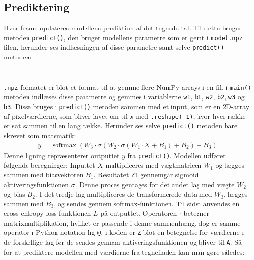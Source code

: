 \documentclass{article}
\begin{document}
\subsection{Prediktering}
Hver frame opdateres modellens prediktion af det tegnede tal. Til dette bruges metoden \texttt{predict()}, den bruger modellens parametre som er gemt i \texttt{model.npz} filen, herunder ses indlæsningen af disse parametre samt selve \texttt{predict()} metoden:
\inputminted[firstline=100, lastline=110]{python}{run.py}\noindent
\inputminted[firstline=89, lastline=97]{python}{run.py}\noindent
\texttt{.npz} formatet er blot et format til at gemme flere NumPy arrays i en fil. i \texttt{main()} metoden indlæses disse parametre og gemmes i variablerne \texttt{w1}, \texttt{b1}, \texttt{w2}, \texttt{b2}, \texttt{w3} og \texttt{b3}. Disse bruges i \texttt{predict()} metoden sammen med et input, som er en 2D-array af pixelværdierne, som bliver lavet om til \texttt{x} med \texttt{.reshape(-1)}, hvor hver række er sat sammen til en lang række. Herunder ses selve \texttt{predict()} metoden bare skrevet som matematik:
\begin{align}
  y = \operatorname{softmax}\left( W_3 \cdot \sigma\left( W_2 \cdot \sigma\left( W_1 \cdot X + B_1 \right) + B_2 \right) + B_3 \right)
\end{align}
Denne ligning repræsenterer outputtet $y$ fra \texttt{predict()}. Modellen udfører følgende beregninger: Inputtet $X$ multipliceres med vægtmatricen $W_1$ og lægges sammen med biasvektoren $B_1$. Resultatet \texttt{Z1} gennemgår sigmoid aktiveringsfunktionen $\sigma$. Denne proces gentages for det andet lag med vægte $W_2$ og bias $B_2$. I det tredje lag multipliceres de transformerede data med $W_3$, lægges sammen med $B_3$, og sendes gennem softmax-funktionen. Til sidst anvendes en cross-entropy loss funktionen $L$ på outputtet. Operatoren $\cdot$ betegner matrixmultiplikation, hvilket er passende i denne sammenhæng, dog er samme operator i Python-notation lig \texttt{@}. i koden er \texttt{Z} blot en betegnelse for værdierne i de forskellige lag før de sendes gennem aktiveringsfunktionen og bliver til \texttt{A}. Så for at prediktere modellen med værdierne fra tegnefladen kan man gøre således:
\inputminted[firstline=133, lastline=134]{python}{run.py}\noindent
\end{document}
